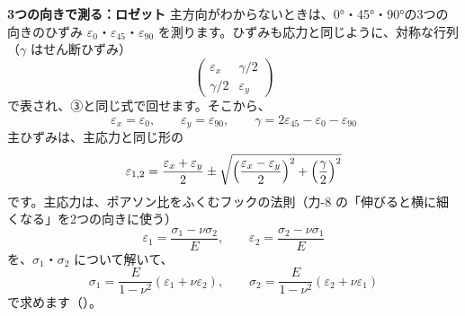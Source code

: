 \noindent\textbf{3つの向きで測る：ロゼット}\quad
主方向がわからないときは、0°・45°・90°の3つの向きのひずみ $\varepsilon_0$・$\varepsilon_{45}$・$\varepsilon_{90}$ を測ります。ひずみも応力と同じように、対称な行列（$\gamma$ はせん断ひずみ）
\[\begin{pmatrix}\varepsilon_x&\gamma/2\\\gamma/2&\varepsilon_y\end{pmatrix}\]
で表され、③と同じ式で回せます。そこから、
\[\varepsilon_x=\varepsilon_0,\qquad\varepsilon_y=\varepsilon_{90},\qquad\gamma=2\varepsilon_{45}-\varepsilon_0-\varepsilon_{90}\]
主ひずみは、主応力と同じ形の
\[\varepsilon_{1,2}=\frac{\varepsilon_x+\varepsilon_y}{2}\pm\sqrt{\Bigl(\frac{\varepsilon_x-\varepsilon_y}{2}\Bigr)^2+\Bigl(\frac{\gamma}{2}\Bigr)^2}\]
です。主応力は、ポアソン比をふくむフックの法則（力-8 の「伸びると横に細くなる」を2つの向きに使う）
\[\varepsilon_1=\frac{\sigma_1-\nu\sigma_2}{E},\qquad\varepsilon_2=\frac{\sigma_2-\nu\sigma_1}{E}\]
を、$\sigma_1$・$\sigma_2$ について解いて、
\[\sigma_1=\frac{E}{1-\nu^2}(\varepsilon_1+\nu\varepsilon_2),\qquad\sigma_2=\frac{E}{1-\nu^2}(\varepsilon_2+\nu\varepsilon_1)\]
で求めます（）。

